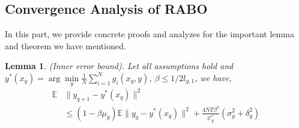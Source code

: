 \documentclass[lettersize,journal]{IEEEtran}
\newtheorem{lemma}{Lemma}
\begin{document}
\subsection{Convergence Analysis of RABO}
In this part, we provide concrete proofs and analyzes for
the important lemma and theorem we have mentioned.
\begin{lemma}\label{lemma:error_inner}
(Inner error bound). Let all assumptions hold and $y^*(x_q)=\arg\min\limits_y \frac{1}{N}\sum_{i=1}^N g_i(x_q,y)$, $\beta\leq1/2l_{g,1}$, we have,
 \begin{align}
     \mathbb{E}&\|y_{q+1}-y^*(x_q)\|^2\\ &\leq(1-\beta\mu_g)\mathbb{E}\|y_{q}-y^*(x_q)\|^2+\frac{4NT\beta^2}{\mathcal{C}_y^*}(\sigma_{g}^2+\delta_{g}^2)\nonumber
    \end{align}
\end{lemma}
\end{document}
